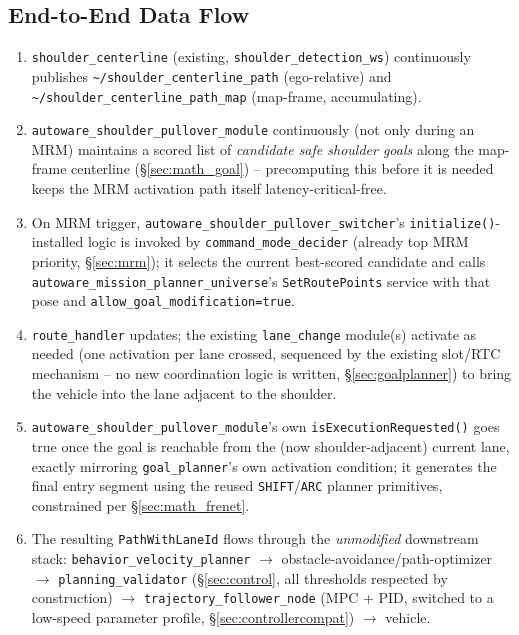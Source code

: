 \documentclass[11pt]{article}
\newcommand{\code}[1]{\texttt{#1}}
\newcommand{\pkg}[1]{\texttt{#1}}
\begin{document}
\subsection{End-to-End Data Flow}
\begin{enumerate}[leftmargin=1.8em]
  \item \pkg{shoulder\_centerline} (existing, \pkg{shoulder\_detection\_ws}) continuously publishes
  \code{\textasciitilde/shoulder\_centerline\_path} (ego-relative) and
  \code{\textasciitilde/shoulder\_centerline\_path\_map} (map-frame, accumulating).
  \item \pkg{autoware\_shoulder\_pullover\_module} continuously (not only during an MRM) maintains a
  scored list of \emph{candidate safe shoulder goals} along the map-frame centerline
  (\S\ref{sec:math_goal}) -- precomputing this before it is needed keeps the MRM activation path
  itself latency-critical-free.
  \item On MRM trigger, \pkg{autoware\_shoulder\_pullover\_switcher}'s \code{initialize()}-installed
  logic is invoked by \code{command\_mode\_decider} (already top MRM priority, \S\ref{sec:mrm}); it
  selects the current best-scored candidate and calls
  \pkg{autoware\_mission\_planner\_universe}'s \code{SetRoutePoints} service with that pose and
  \code{allow\_goal\_modification=true}.
  \item \code{route\_handler} updates; the existing \pkg{lane\_change} module(s) activate as needed
  (one activation per lane crossed, sequenced by the existing slot/RTC mechanism -- no new
  coordination logic is written, \S\ref{sec:goalplanner}) to bring the vehicle into the lane
  adjacent to the shoulder.
  \item \pkg{autoware\_shoulder\_pullover\_module}'s own \code{isExecutionRequested()} goes true
  once the goal is reachable from the (now shoulder-adjacent) current lane, exactly mirroring
  \pkg{goal\_planner}'s own activation condition; it generates the final entry segment using the
  reused \code{SHIFT}/\code{ARC} planner primitives, constrained per \S\ref{sec:math_frenet}.
  \item The resulting \code{PathWithLaneId} flows through the \emph{unmodified} downstream stack:
  \pkg{behavior\_velocity\_planner} $\to$ obstacle-avoidance/path-optimizer $\to$
  \pkg{planning\_validator} (\S\ref{sec:control}, all thresholds respected by construction) $\to$
  \pkg{trajectory\_follower\_node} (MPC + PID, switched to a low-speed parameter profile,
  \S\ref{sec:controllercompat}) $\to$ vehicle.
\end{enumerate}
\end{document}
